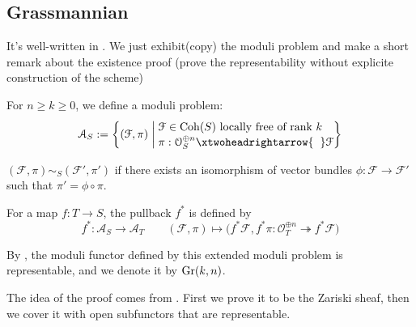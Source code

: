 \subsection{Grassmannian}
It's well-written in \cite[16.7]{FOAG}. We just exhibit(copy) the moduli problem and make a short remark about the existence proof (prove the representability without explicite construction of the scheme)
\begin{eg}[{Grassmannian $\Gr(k,n)$}]
For $n \geqslant k \geqslant 0$, we define a moduli problem:
$$\mathcal{A}_S:=\left\{(\mathcal{F},\pi)  \;\middle|\; \begin{aligned}
&\\[-5mm]
&\mathcal{F} \in \Coh(S) \text{ locally free of rank $k$ }\\[-1mm]
& \pi:\mathcal{O}_S^{\oplus n} \xtwoheadrightarrow{\hspace{2mm}}  \mathcal{F}
\end{aligned}
 \right\}$$
 
   $(\mathcal{F},\pi) \sim_S (\mathcal{F}',\pi')$ if there exists an isomorphism of vector bundles $\phi:\mathcal{F} \longrightarrow \mathcal{F}'$ such that $\pi'=\phi \circ \pi$.
   
   For a map $f:T \longrightarrow S$, the pullback $f^*$ is defined by
      $$f^*:\mathcal{A}_S \longrightarrow \mathcal{A}_T \qquad (\mathcal{F},\pi) \longmapsto \big(f^*\mathcal{F},f^* \pi:\mathcal{O}_T^{\oplus n} \twoheadrightarrow f^*\mathcal{F}\big)$$
      
      By \cite[16.7, page 442-443]{FOAG}, the moduli functor defined by this extended moduli problem is representable, and we denote it by $\Gr(k,n)$.
\end{eg}
\begin{remark}
The idea of the proof comes from \cite[9.1.I]{FOAG}. First we prove it to be the Zariski sheaf, then we cover it with open subfunctors that are representable.
\end{remark}

